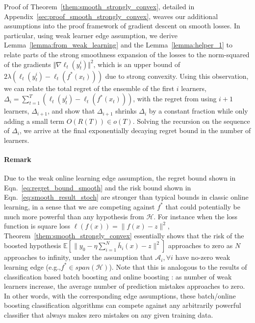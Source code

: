 Proof of Theorem~\ref{them:smooth_strongly_convex}, detailed in Appendix~\ref{sec:proof_smooth_strongly_convex}, weaves our additional assumptions 
into the proof framework of gradient descent on smooth losses. In particular, using weak learner edge assumption, we derive  
Lemma~\ref{lemma:from_weak_learning} and the Lemma~\ref{lemma:helper_1} to relate parts of the strong smoothness expansion of the losses to the norm-squared of the gradients $\Vert \nabla \ell _t(y_t^i) \Vert^2$, which is an upper bound of \mbox{$2\lambda (\ell_t(y_t^i) - \ell_t(f^*(x_t)))$} due to strong convexity. Using this observation,
we can relate the total regret of the ensemble of the first $i$ learners, 
\mbox{$\Delta_i = \sum_{t=1}^T (\ell_t(y_t^i) - \ell_t(f^*(x_t)))$}, with the regret from using $i+1$ learners, $\Delta_{i+1}$, and show that $\Delta_{i+1}$ shrinks $\Delta_i$ by a constant fraction while only adding a small term $O(R(T)) \in o(T)$. Solving the recursion on the sequence of $\Delta_{i}$, we arrive at the final exponentially decaying regret bound in the number of learners. 

\paragraph{Remark} Due to the weak online learning edge assumption, the regret bound shown in Eqn.~\ref{eq:regret_bound_smooth} and the risk bound shown in Eqn.~\ref{eq:smooth_result_stoch} are stronger than typical bounds in classic online learning, in a sense that we are competing against $f^*$ that could potentially be much more powerful than any hypothesis from $\mathcal{H}$. For instance when the loss function is square loss $\ell(f(x)) = \|f(x) - z\|^2$, Theorem~\ref{them:smooth_strongly_convex} essentially shows that the risk of the boosted hypothesis $\mathbb{E}[\|y_0-\eta\sum_{i=1}^N\bar{h}_i(x) - z\|^2]$ approaches to zero as $N$ approaches to infinity, under the assumption that $\mathcal{A}_i,\forall i$ have no-zero weak learning edge (e.g.,$f^* \in span(\mathcal{H})$). Note that this is analogous to the results of classification based batch boosting \citep{freund1995desicion,grubb2011generalized} and online boosting \citep{beygelzimer2015optimal}: as number of weak learners increase, the average number of prediction mistakes approaches to zero. In other words, with the corresponding edge assumptions, these batch/online boosting classification algorithms can compete against any arbitrarily powerful classifier that always makes zero mistakes on any given training data.

